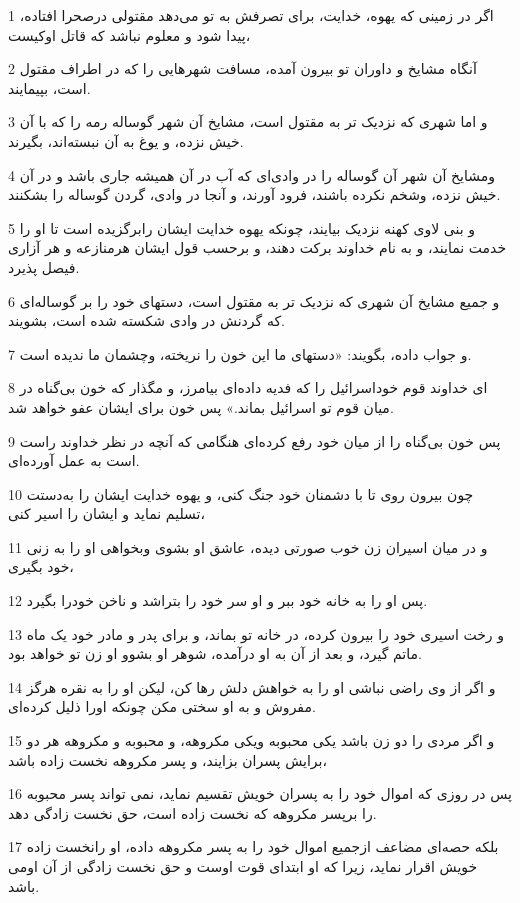 \par 1 اگر در زمینی که یهوه، خدایت، برای تصرفش به تو می‌دهد مقتولی درصحرا افتاده، پیدا شود و معلوم نباشد که قاتل اوکیست،
\par 2 آنگاه مشایخ و داوران تو بیرون آمده، مسافت شهرهایی را که در اطراف مقتول است، بپیمایند.
\par 3 و اما شهری که نزدیک تر به مقتول است، مشایخ آن شهر گوساله رمه را که با آن خیش نزده، و یوغ به آن نبسته‌اند، بگیرند.
\par 4 ومشایخ آن شهر آن گوساله را در وادی‌ای که آب در آن همیشه جاری باشد و در آن خیش نزده، وشخم نکرده باشند، فرود آورند، و آنجا در وادی، گردن گوساله را بشکنند.
\par 5 و بنی لاوی کهنه نزدیک بیایند، چونکه یهوه خدایت ایشان رابرگزیده است تا او را خدمت نمایند، و به نام خداوند برکت دهند، و برحسب قول ایشان هرمنازعه و هر آزاری فیصل پذیرد.
\par 6 و جمیع مشایخ آن شهری که نزدیک تر به مقتول است، دستهای خود را بر گوساله‌ای که گردنش در وادی شکسته شده است، بشویند.
\par 7 و جواب داده، بگویند: «دستهای ما این خون را نریخته، وچشمان ما ندیده است.
\par 8 ‌ای خداوند قوم خوداسرائیل را که فدیه داده‌ای بیامرز، و مگذار که خون بی‌گناه در میان قوم تو اسرائیل بماند.» پس خون برای ایشان عفو خواهد شد.
\par 9 پس خون بی‌گناه را از میان خود رفع کرده‌ای هنگامی که آنچه در نظر خداوند راست است به عمل آورده‌ای.
\par 10 چون بیرون روی تا با دشمنان خود جنگ کنی، و یهوه خدایت ایشان را به‌دستت تسلیم نماید و ایشان را اسیر کنی،
\par 11 و در میان اسیران زن خوب صورتی دیده، عاشق او بشوی وبخواهی او را به زنی خود بگیری،
\par 12 پس او را به خانه خود ببر و او سر خود را بتراشد و ناخن خودرا بگیرد.
\par 13 و رخت اسیری خود را بیرون کرده، در خانه تو بماند، و برای پدر و مادر خود یک ماه ماتم گیرد، و بعد از آن به او درآمده، شوهر او بشوو او زن تو خواهد بود.
\par 14 و اگر از وی راضی نباشی او را به خواهش دلش رها کن، لیکن او را به نقره هرگز مفروش و به او سختی مکن چونکه اورا ذلیل کرده‌ای.
\par 15 و اگر مردی را دو زن باشد یکی محبوبه ویکی مکروهه، و محبوبه و مکروهه هر دو برایش پسران بزایند، و پسر مکروهه نخست زاده باشد،
\par 16 پس در روزی که اموال خود را به پسران خویش تقسیم نماید، نمی تواند پسر محبوبه را برپسر مکروهه که نخست زاده است، حق نخست زادگی دهد.
\par 17 بلکه حصه‌ای مضاعف ازجمیع اموال خود را به پسر مکروهه داده، او رانخست زاده خویش اقرار نماید، زیرا که او ابتدای قوت اوست و حق نخست زادگی از آن اومی باشد.
